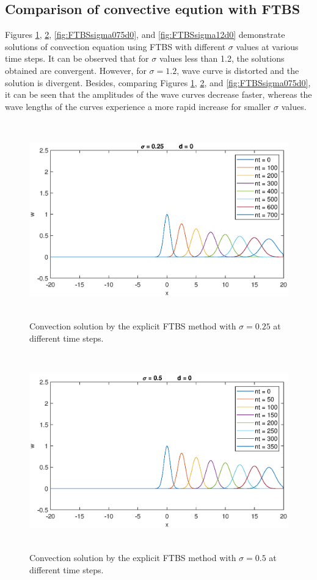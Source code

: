 \documentclass[letterpaper,12pt]{article}
\begin{document}
\subsection{Comparison of convective eqution with FTBS}
Figures \ref{fig:FTBSsigma025d0}, \ref{fig:FTBSsigma05d0}, \ref{fig:FTBSsigma075d0}, and \ref{fig:FTBSsigma12d0}
demonstrate solutions of convection equation using FTBS with different $\sigma$ values at various time
steps. It can be observed that for $\sigma$ values less than 1.2, the solutions obtained are convergent.
However, for $\sigma = 1.2$, wave curve is distorted and the solution is divergent. Besides, comparing Figures
\ref{fig:FTBSsigma025d0}, \ref{fig:FTBSsigma05d0}, and \ref{fig:FTBSsigma075d0}, it can be seen that the
amplitudes of the wave curves decrease faster, whereas the wave lengths of the curves experience a more rapid
increase for smaller $\sigma$ values.
\begin{figure}[!ht] 
	\centering 
	\includegraphics[max height=8.5cm]{graphs/FTBS/Convection/sigma025d0.eps}
	\caption{Convection solution by the explicit FTBS method with $\sigma= 0.25$ at different time steps.}
	 \label{fig:FTBSsigma025d0}
\end{figure}
\begin{figure}[!ht] 
	\centering 
	\includegraphics[max height=8.5cm]{graphs/FTBS/Convection/sigma05d0.eps}
	\caption{Convection solution by the explicit FTBS method with $\sigma= 0.5$ at different time steps.}
	 \label{fig:FTBSsigma05d0}
\end{figure}
\end{document}
